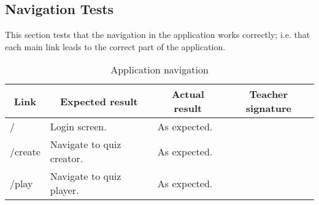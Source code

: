 \subsection{Navigation Tests}
This section tests that the navigation in the application works correctly; i.e. that each main link leads to the correct part of the application.

\begin{table}[]
\centering
\begin{tabular}{|l|l|l|l|}
\hline
\multicolumn{1}{|c|}{\textbf{Link}} & \multicolumn{1}{c|}{\textbf{Expected result}} & \multicolumn{1}{c|}{\textbf{Actual result}} & \multicolumn{1}{c|}{\textbf{Teacher signature}} \\ \hline
/                                   & Login screen.                                 & As expected.                                &                                                 \\ \hline
/create                             & Navigate to quiz creator.                     & As expected.                                &                                                 \\ \hline
/play                               & Navigate to quiz player.                      & As expected.                                &                                                 \\ \hline
\end{tabular}
\caption{Application navigation}
\label{application-navigation}
\end{table}
